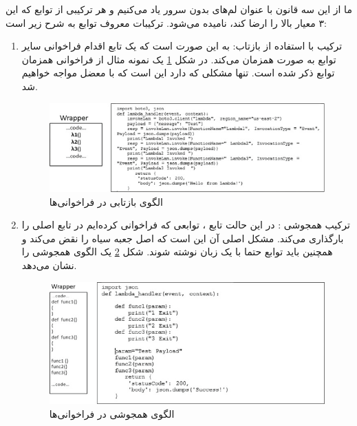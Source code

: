 ما از این سه قانون با عنوان لم‌های بدون سرور یاد می‌کنیم و هر ترکیبی از توابع که این ۳ معیار بالا را ارضا کند،  نامیده می‌شود. ترکیبات معروف توابع به شرح زیر است: 

\begin{enumerate}
	
	\item ترکیب با استفاده از بازتاب‌: به این صورت است که یک تابع اقدام فراخوانی سایر توابع به صورت همزمان  می‌کند. در شکل \ref{fig:FaaS-Reflective-Pattern.png} یک نمونه مثال از فراخوانی همزمان توابع ذکر شده است. تنها مشکلی که دارد این است که با معضل  مواجه خواهیم شد. 
	
	\begin{figure}
		\centering
		\includegraphics[width=\linewidth]{figs/FaaS-Reflective-Pattern.png}
		\caption {الگوی بازتابی در فراخوانی‌ها}
		\label{fig:FaaS-Reflective-Pattern.png}
	\end{figure}
	
	\item ترکیب همجوشی : در این حالت تابع ، توابعی که فراخوانی کرده‌ایم در تابع اصلی را بارگذاری می‌کند. مشکل اصلی آن این است که اصل جعبه سیاه را نقض می‌کند و همچنین باید توابع حتما با یک زبان نوشته شوند.  شکل \ref{fig:FaaS-Fusion-Pattern} یک الگوی همجوشی را نشان می‌دهد. 
	
	\begin{figure}
		\centering
		\includegraphics[width=\linewidth]{figs/FaaS-Fusion-Pattern}
		\caption {الگوی همجوشی در فراخوانی‌ها}
		\label{fig:FaaS-Fusion-Pattern}
	\end{figure}
	

\end{enumerate}
